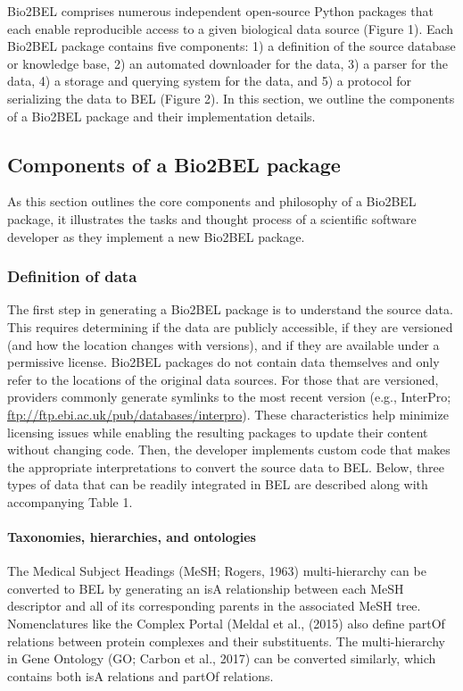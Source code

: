 Bio2BEL comprises numerous independent open-source Python packages that each enable reproducible access to a given biological data source (Figure 1).
Each Bio2BEL package contains five components: 1) a definition of the source database or knowledge base, 2) an automated downloader for the data, 3) a parser for the data, 4) a storage and querying system for the data, and 5) a protocol for serializing the data to BEL (Figure 2).
In this section, we outline the components of a Bio2BEL package and their implementation details.

\subsection*{Components of a Bio2BEL package}

As this section outlines the core components and philosophy of a Bio2BEL package, it illustrates the tasks and thought process of a scientific software developer as they implement a new Bio2BEL package.

\subsubsection*{Definition of data}

The first step in generating a Bio2BEL package is to understand the source data.
This requires determining if the data are publicly accessible, if they are versioned (and how the location changes with versions), and if they are available under a permissive license.
Bio2BEL packages do not contain data themselves and only refer to the locations of the original data sources.
For those that are versioned, providers commonly generate symlinks to the most recent version (e.g., InterPro; \url{ftp://ftp.ebi.ac.uk/pub/databases/interpro}).
These characteristics help minimize licensing issues while enabling the resulting packages to update their content without changing code.
Then, the developer implements custom code that makes the appropriate interpretations to convert the source data to BEL.
Below, three types of data that can be readily integrated in BEL are described along with accompanying Table 1.

\paragraph*{Taxonomies, hierarchies, and ontologies}

The Medical Subject Headings (MeSH; Rogers, 1963) multi-hierarchy can be converted to BEL by generating an isA relationship between each MeSH descriptor and all of its corresponding parents in the associated MeSH tree.
Nomenclatures like the Complex Portal (Meldal et al., (2015) also define partOf relations between protein complexes and their substituents.
The multi-hierarchy in Gene Ontology (GO; Carbon et al., 2017) can be converted similarly, which contains both isA relations and partOf relations.

